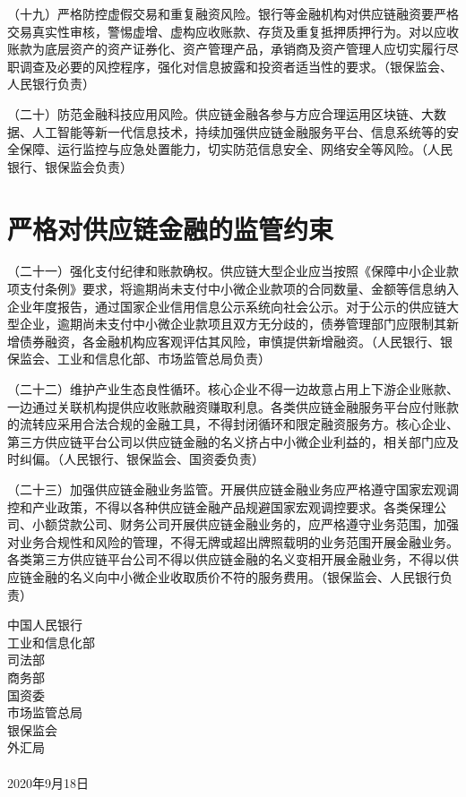 （十九）严格防控虚假交易和重复融资风险。银行等金融机构对供应链融资要严格交易真实性审核，警惕虚增、虚构应收账款、存货及重复抵押质押行为。对以应收账款为底层资产的资产证券化、资产管理产品，承销商及资产管理人应切实履行尽职调查及必要的风控程序，强化对信息披露和投资者适当性的要求。（银保监会、人民银行负责）

（二十）防范金融科技应用风险。供应链金融各参与方应合理运用区块链、大数据、人工智能等新一代信息技术，持续加强供应链金融服务平台、信息系统等的安全保障、运行监控与应急处置能力，切实防范信息安全、网络安全等风险。（人民银行、银保监会负责）

\section{严格对供应链金融的监管约束}

（二十一）强化支付纪律和账款确权。供应链大型企业应当按照《保障中小企业款项支付条例》要求，将逾期尚未支付中小微企业款项的合同数量、金额等信息纳入企业年度报告，通过国家企业信用信息公示系统向社会公示。对于公示的供应链大型企业，逾期尚未支付中小微企业款项且双方无分歧的，债券管理部门应限制其新增债券融资，各金融机构应客观评估其风险，审慎提供新增融资。（人民银行、银保监会、工业和信息化部、市场监管总局负责）

（二十二）维护产业生态良性循环。核心企业不得一边故意占用上下游企业账款、一边通过关联机构提供应收账款融资赚取利息。各类供应链金融服务平台应付账款的流转应采用合法合规的金融工具，不得封闭循环和限定融资服务方。核心企业、第三方供应链平台公司以供应链金融的名义挤占中小微企业利益的，相关部门应及时纠偏。（人民银行、银保监会、国资委负责）

（二十三）加强供应链金融业务监管。开展供应链金融业务应严格遵守国家宏观调控和产业政策，不得以各种供应链金融产品规避国家宏观调控要求。各类保理公司、小额贷款公司、财务公司开展供应链金融业务的，应严格遵守业务范围，加强对业务合规性和风险的管理，不得无牌或超出牌照载明的业务范围开展金融业务。各类第三方供应链平台公司不得以供应链金融的名义变相开展金融业务，不得以供应链金融的名义向中小微企业收取质价不符的服务费用。（银保监会、人民银行负责） \\

\begin{flushright}
中国人民银行
\\ 工业和信息化部 
\\ 司法部
\\ 商务部
\\ 国资委
\\ 市场监管总局
\\ 银保监会
\\ 外汇局
\\ ~
\\ 2020年9月18日
\end{flushright}
